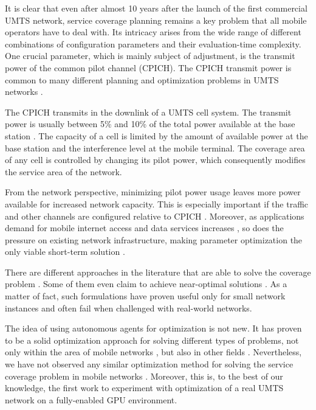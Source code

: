 It is clear that even after almost 10 years after the launch of the
first commercial UMTS network, service coverage planning remains a
key problem that all mobile operators have to deal with. Its intricacy
arises from the wide range of different combinations of configuration
parameters and their evaluation-time complexity. One crucial parameter,
which is mainly subject of adjustment, is the transmit power of the
common pilot channel (CPICH). The CPICH transmit power is common to
many different planning and optimization problems in UMTS networks
\cite{Nawrocki_Understanding:2006}.

The CPICH transmits in the downlink of a UMTS cell system. The transmit
power is usually between 5\% and 10\% of the total power available
at the base station \cite{Holma_WCDMA.for.UMTS:2005}. The capacity
of a cell is limited by the amount of available power at the base
station and the interference level at the mobile terminal. The coverage
area of any cell is controlled by changing its pilot power, which
consequently modifies the service area of the network.

From the network perspective, minimizing pilot power usage leaves
more power available for increased network capacity. This is especially
important if the traffic and other channels are configured relative
to CPICH \cite{Holma_WCDMA.for.UMTS:2005}. Moreover, as applications
demand for mobile internet access and data services increases \cite{Cunningham_Network.growth.theory.and.evidence:2010},
so does the pressure on existing network infrastructure, making parameter
optimization the only viable short-term solution \cite{Nawrocki_Understanding:2006}.

There are different approaches in the literature that are able to
solve the coverage problem \cite{Nawrocki_Understanding:2006,Siomina_Pilot.power.optimization:2004}.
Some of them even claim to achieve near-optimal solutions \cite{Siomina:Minimum.pilot.power.for.service.coverage}.
As a matter of fact, such formulations have proven useful only for
small network instances and often fail when challenged with real-world
networks.

The idea of using autonomous agents for optimization is not new. It
has proven to be a solid optimization approach for solving different
types of problems, not only within the area of mobile networks \cite{Esposito_Genetic.optimization.for.optimum.3G.network.planning:2010,Cheung_Realtime.video.using.agent.over.3G.networks:2005},
but also in other fields \cite{Vasile_Hybrid.multiagent.approach.for.optimization:2009,Valcarce_Applying.FDTD.to.the.coverage.prediction.of.WiMAX:2009}.
Nevertheless, we have not observed any similar optimization method
for solving the service coverage problem in mobile networks \cite{Benedicic_Pilot.power.optimization:2010}.
Moreover, this is, to the best of our knowledge, the first work to
experiment with optimization of a real UMTS network on a fully-enabled
GPU environment.

